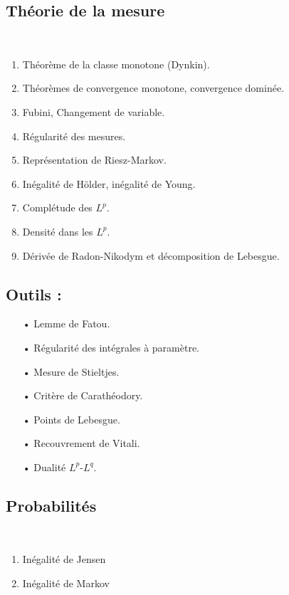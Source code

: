 \documentclass[11pt,a4paper]{article}
\begin{document}
\begin{center}
\section*{Théorie de la mesure} 
\end{center}
~\\
\begin{enumerate}
\item Théorème de la classe monotone (Dynkin).
\item Théorèmes de convergence monotone, convergence dominée.
\item Fubini, Changement de variable.
\item Régularité des mesures.
\item Représentation de Riesz-Markov.
\item Inégalité de Hölder, inégalité de Young.
\item Complétude des $L^p$.
\item Densité dans les $L^p$.
\item Dérivée de Radon-Nikodym et décomposition de Lebesgue.
\end{enumerate}


\subsection*{Outils :}
\begin{itemize}
\item[•] Lemme de Fatou.
\item[•] Régularité des intégrales à paramètre.
\item[•] Mesure de Stieltjes.
\item[•] Critère de Carathéodory.
\item[•] Points de Lebesgue.
\item[•] Recouvrement de Vitali.
\item[•] Dualité $L^p$-$L^q$.
\end{itemize}



\newpage\begin{center}
\section*{Probabilités} 
\end{center}
~\\
\begin{enumerate}
\item Inégalité de Jensen
\item Inégalité de Markov
\end{enumerate}
\end{document}
